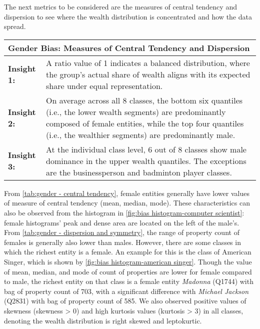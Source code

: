 The next metrics to be considered are the measures of central tendency and dispersion to see where the wealth distribution is concentrated and how the data spread.

\begin{table}[h]
    \centering
    \renewcommand{\arraystretch}{1.3}
    \begin{tabular}{|l p{12cm}|} 
        \hline
        \multicolumn{2}{|l|}{\textbf{Gender Bias: Measures of Central Tendency and Dispersion}} \\
        \hline
        \textbf{Insight 1:} & A ratio value of 1 indicates a balanced distribution, where the group's actual share of wealth aligns with its expected share under equal representation. \\
        \textbf{Insight 2:} & On average across all 8 classes, the bottom six quantiles (i.e., the lower wealth segments) are predominantly composed of female entities, while the top four quantiles (i.e., the wealthier segments) are predominantly male. \\
        \textbf{Insight 3:} & At the individual class level, 6 out of 8 classes show male dominance in the upper wealth quantiles. The exceptions are the businessperson and badminton player classes. \\
        \hline
    \end{tabular}
\end{table}

From \autoref{tab:gender - central tendency}, female entities generally have lower values of measure of central tendency (mean, median, mode). These characteristics can also be observed from the histogram in \autoref{fig:bias histogram-computer scientist}: female histograms’ peak and dense area are located on the left of the male’s. From \autoref{tab:gender - dispersion and symmetry}, the range of property count of females is generally also lower than males. However, there are some classes in which the richest entity is a female. An example for this is the class of American Singer, which is shown by \autoref{fig:bias histogram-american singer}. Though the value of mean, median, and mode of count of properties are lower for female compared to male, the richest entity on that class is a female entity \textit{Madonna} (Q1744) with bag of property count of 703, with a significant difference with \textit{Michael Jackson} (Q2831) with bag of property count of 585. We also observed positive values of skewness (skewness > 0) and high kurtosis values (kurtosis > 3) in all classes, denoting the wealth distribution is right skewed and leptokurtic.

